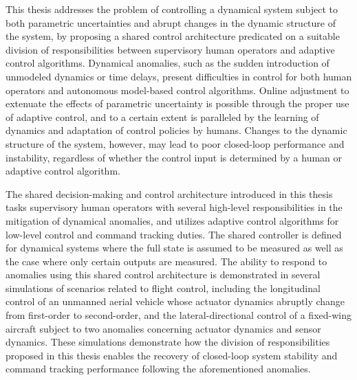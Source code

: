% 
% 
%

This thesis addresses the problem of controlling a dynamical system subject to both parametric uncertainties and abrupt changes in the dynamic structure of the system, by proposing a shared control architecture predicated on a suitable division of responsibilities between supervisory human operators and adaptive control algorithms. Dynamical anomalies, such as the sudden introduction of unmodeled dynamics or time delays, present difficulties in control for both human operators and autonomous model-based control algorithms. Online adjustment to extenuate the effects of parametric uncertainty is possible through the proper use of adaptive control, and to a certain extent is paralleled by the learning of dynamics and adaptation of control policies by humans. Changes to the dynamic structure of the system, however, may lead to poor closed-loop performance and instability, regardless of whether the control input is determined by a human or adaptive control algorithm.

The shared decision-making and control architecture introduced in this thesis tasks supervisory human operators with several high-level responsibilities in the mitigation of dynamical anomalies, and utilizes adaptive control algorithms for low-level control and command tracking duties. The shared controller is defined for dynamical systems where the full state is assumed to be measured as well as the case where only certain outputs are measured. The ability to respond to anomalies using this shared control architecture is demonstrated in several simulations of scenarios related to flight control, including the longitudinal control of an unmanned aerial vehicle whose actuator dynamics abruptly change from first-order to second-order, and the lateral-directional control of a fixed-wing aircraft subject to two anomalies concerning actuator dynamics and sensor dynamics. These simulations demonstrate how the division of responsibilities proposed in this thesis enables the recovery of closed-loop system stability and command tracking performance following the aforementioned anomalies. 